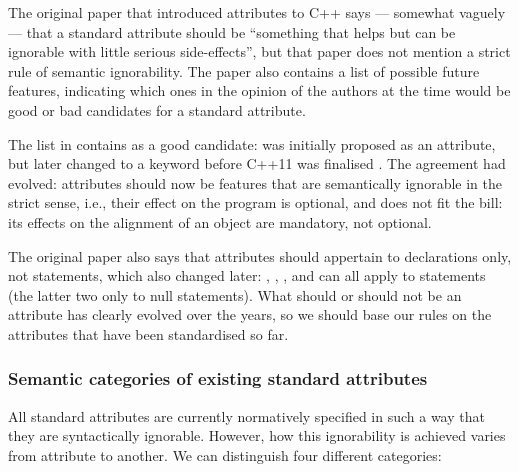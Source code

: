 The original paper that introduced attributes to C++ \cite{N2761} says --- somewhat vaguely --- that a standard attribute should be  ``something that helps but can be ignorable with little serious side-effects'', but that paper does not mention a strict rule of semantic ignorability. The paper also contains a list of possible future features, indicating which ones in the opinion of the authors at the time would be good or bad candidates for a standard attribute.

The list in \cite{N2761} contains  as a good candidate:  was initially proposed as an attribute, but later changed to a keyword before C++11 was finalised \cite{N3190}. The agreement had evolved: attributes should now be features that are semantically ignorable in the strict sense, i.e., their effect on the program is optional, and  does not fit the bill: its effects on the alignment of an object are mandatory, not optional.

The original paper also says that attributes should appertain to declarations only, not statements, which also changed later: , , , and  can all apply to statements (the latter two only to null statements). What should or should not be an attribute has clearly evolved over the years, so we should base our rules on the attributes that have been standardised so far.

\subsubsection{Semantic categories of existing standard attributes}
\label{subsubsec:attributecategories}

All standard attributes are currently normatively specified in such a way that they are syntactically ignorable. However, how this ignorability is achieved varies from attribute to another. We can distinguish four different categories:

